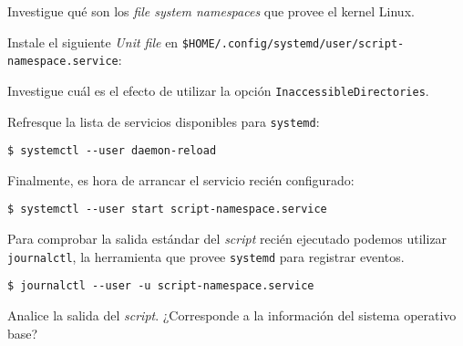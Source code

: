 \begin{questions}
  \question Investigue qué son los \textit{file system namespaces} que
  provee el kernel Linux.

  \question Instale el siguiente \textit{Unit file} en
  \texttt{\$HOME/.config/systemd/user/script-namespace.service}:

  

  \question Investigue cuál es el efecto de utilizar la opción
  \texttt{InaccessibleDirectories}.

    \question Refresque la lista de servicios disponibles para
  \texttt{systemd}:
  \begin{verbatim}
$ systemctl --user daemon-reload
\end{verbatim}

    \question Finalmente, es hora de arrancar el servicio recién configurado:
\begin{verbatim}
$ systemctl --user start script-namespace.service
\end{verbatim}

    \question Para comprobar la salida estándar del \textit{script} recién
    ejecutado podemos utilizar \texttt{journalctl}, la herramienta que
    provee \texttt{systemd} para registrar eventos.
\begin{verbatim}
$ journalctl --user -u script-namespace.service
\end{verbatim}

    Analice la salida del \textit{script}. ¿Corresponde a la información
    del sistema operativo base?
\end{questions}


